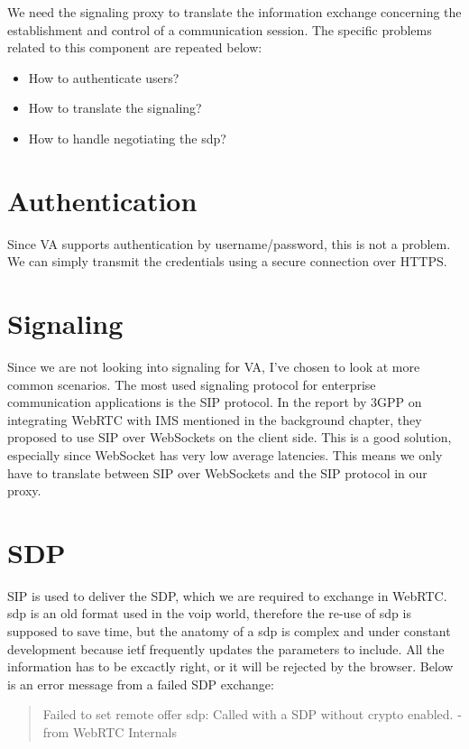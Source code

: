 We need the signaling proxy to translate the information exchange concerning the establishment and control of a communication session. The specific problems related to this component are repeated below:

\begin{itemize}
\item{How to authenticate users?}
\item{How to translate the signaling?}
\item{How to handle negotiating the \gls{sdp}?}
\end{itemize}

\section{Authentication}
Since VA supports authentication by username/password, this is not a problem. We can simply transmit the credentials using a secure connection over HTTPS.

\section{Signaling}
Since we are not looking into signaling for VA, I've chosen to look at more common scenarios. The most used signaling protocol for enterprise communication applications is the SIP protocol. In the report by 3GPP\cite{3gpp-wrtc-access-ims} on integrating WebRTC with IMS mentioned in the background chapter, they proposed to use SIP over WebSockets on the client side. This is a good solution, especially since WebSocket has very low average latencies\cite{websocket-overhead}. This means we only have to translate between SIP over WebSockets and the SIP protocol in our proxy.

\section{SDP}
SIP is used to deliver the SDP, which we are required to exchange in WebRTC. \gls{sdp} is an old format used in the \gls{voip} world, therefore the re-use of \gls{sdp} is supposed to save time, but the anatomy of a \gls{sdp} is complex and under constant development because \gls{ietf} frequently updates the parameters to include. All the information has to be excactly right, or it will be rejected by the browser. Below is an error message from a failed SDP exchange:

\begin{quote}
Failed to set remote offer sdp: Called with a SDP without crypto enabled. -from WebRTC Internals
\end{quote}

